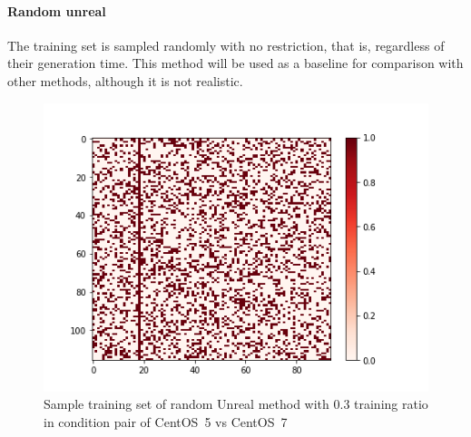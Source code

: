 \documentclass[10pt, conference, compsocconf]{IEEEtran}
\begin{document}
\paragraph{Random unreal}
The training set is sampled randomly with no restriction, that is,
regardless of their generation time.  This method will be used as a
baseline for comparison with other methods, although it is not
realistic.
\begin{figure}
  \includegraphics[width=\columnwidth]{figures/5vs7_random-unreal_0.3_training_plot.png}
  \caption{Sample training set of random Unreal method with 0.3 training ratio in condition pair of CentOS~5 vs CentOS~7}
  \label{fig:Sample Training set }
\end{figure}

\end{document}
